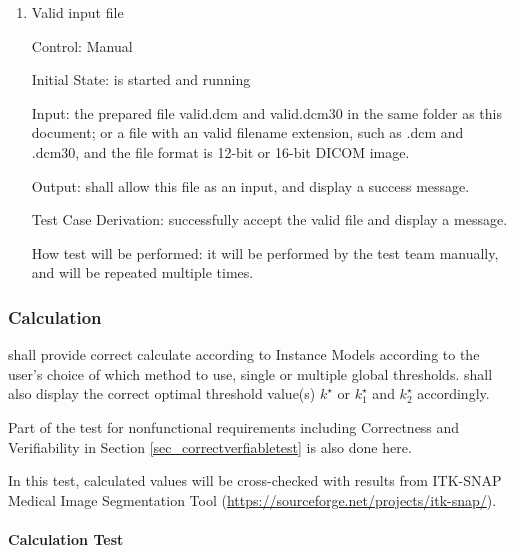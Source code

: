 \documentclass[12pt, titlepage]{article}
\begin{document}
\begin{enumerate}
\item{Valid input file}

Control: Manual
					
Initial State: \progname{} is started and running
					
Input: the prepared file valid.dcm and valid.dcm30 in the same folder as this
document; or a file with an valid filename extension, such as .dcm and .dcm30,
and the file format is 12-bit or 16-bit DICOM image.
					
Output: \progname{} shall allow this file as an input, and display a success
message.

Test Case Derivation: successfully accept the valid file and display a message.

How test will be performed: it will be performed by the test team manually, and
will be repeated multiple times.
\end{enumerate}

\subsubsection{Calculation}
\label{sec_caltest} \progname{} shall provide correct calculate according to
Instance Models according to the user's choice of which method to use, single
or multiple global thresholds. \progname{} shall also display the correct
optimal threshold value(s) $k^{\star}$ or $k^{\star}_{1}$ and $k^{\star}_{2}$
accordingly.

Part of the test for nonfunctional requirements including Correctness and
Verifiability in Section \ref{sec_correctverfiabletest} is also done here.

In this test, calculated values will be cross-checked with results from
ITK-SNAP Medical Image Segmentation Tool
(\url{https://sourceforge.net/projects/itk-snap/}). 
\paragraph{Calculation Test}
\end{document}
